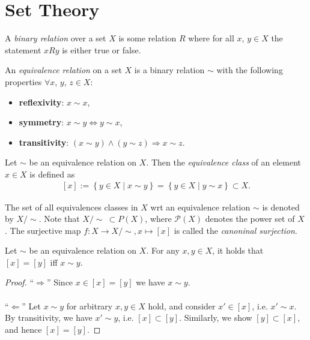 \section{Set Theory}
\begin{defn}
	A \textit{binary relation} over a set $X$ is some relation $R$ where for all $x$, $y\in X$ the statement $xRy$ is either true or false. 
\end{defn}

\begin{defn}\label{defn:equivalence_relation}
	An \textit{equivalence relation} on a set $X$ is a binary relation $\sim$ with the following properties $\forall x$, $y$, $z \in X$: 
	\begin{itemize}
		\item \textbf{reflexivity}: $x\sim x$, 
		\item \textbf{symmetry}: $x \sim y\Leftrightarrow y\sim x$, 
		\item  \textbf{transitivity}: $\left(x\sim y\right) \wedge \left(y\sim z\right)\Rightarrow x\sim z$.  
	\end{itemize}
\end{defn}

\begin{defn}
	Let $\sim$ be an equivalence relation on $X$. Then the \textit{equivalence class} of an element $x\in X$ is defined as 
	\begin{align}
		\left[x\right] := \left\{y\in X \mid x\sim y \right\} = \left\{ y\in X \mid y\sim x \right\} \subset X. 
	\end{align}
	
	The set of all equivalences classes in $X$ wrt an equivalence relation $\sim$ is denoted by $X/\sim$. Note that $X/\sim\ \subset P(X)$, where $\mathcal P(X)$ denotes the power set of $X$ \cite{src:quotient_set_X_by_equivalence_relation}. The surjective map $f: X\rightarrow X/\sim, x\mapsto [x]$ is called the \textit{canoninal surjection}.
\end{defn}

\begin{theorem}\label{thrm:characterization_equivalence_classes}
	Let $\sim$ be an equivalence relation on $X$. For any $x, y\in X$, it holds that $[x] = [y]$ iff $x\sim y$.
\end{theorem}

\begin{proof}
	\enquote{$\Longrightarrow$} Since $x\in[x] = [y]$ we have $x\sim y$.
	\\ \\
	\enquote{$\Longleftarrow$} Let $x\sim y$ for arbitrary $x, y\in X$ hold, and consider $x'\in [x]$, i.e. $x'\sim x$. By transitivity, we have $x' \sim y$, i.e. $[x] \subset [y]$. Similarly, we show $[y]\subset [x]$, and hence $[x] = [y]$.
\end{proof}

